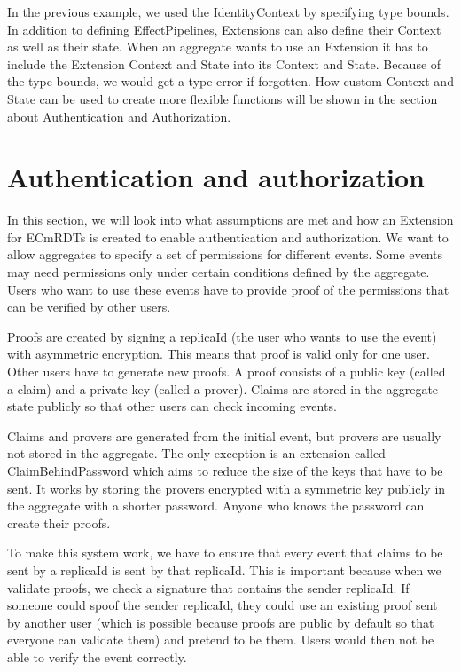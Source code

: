 \documentclass[
	ngerman,
	ruledheaders=section,   %
	class=report,		    %
	thesis={type=bachelor}, %
	accentcolor=9c,			%
	custommargins=true,    %
	marginpar=false,        %
	parskip=half-,          %
	fontsize=11pt,          %
]{tudapub}
\begin{document}
In the previous example, we used the IdentityContext by specifying type bounds. In addition to defining EffectPipelines, Extensions can also define their Context as well as their state. When an aggregate wants to use an Extension it has to include the Extension Context and State into its Context and State. Because of the type bounds, we would get a type error if forgotten. How custom Context and State can be used to create more flexible functions will be shown in the section about Authentication and Authorization.

\section{Authentication and authorization}
In this section, we will look into what assumptions are met and how an Extension for ECmRDTs is created to enable authentication and authorization. We want to allow aggregates to specify a set of permissions for different events. Some events may need permissions only under certain conditions defined by the aggregate. Users who want to use these events have to provide proof of the permissions that can be verified by other users.

Proofs are created by signing a replicaId (the user who wants to use the event) with asymmetric encryption. This means that proof is valid only for one user. Other users have to generate new proofs. A proof consists of a public key (called a claim) and a private key (called a prover). Claims are stored in the aggregate state publicly so that other users can check incoming events.

Claims and provers are generated from the initial event, but provers are usually not stored in the aggregate. The only exception is an extension called ClaimBehindPassword which aims to reduce the size of the keys that have to be sent. It works by storing the provers encrypted with a symmetric key publicly in the aggregate with a shorter password. Anyone who knows the password can create their proofs.

To make this system work, we have to ensure that every event that claims to be sent by a replicaId is sent by that replicaId. This is important because when we validate proofs, we check a signature that contains the sender replicaId. If someone could spoof the sender replicaId, they could use an existing proof sent by another user (which is possible because proofs are public by default so that everyone can validate them) and pretend to be them. Users would then not be able to verify the event correctly.
\end{document}
